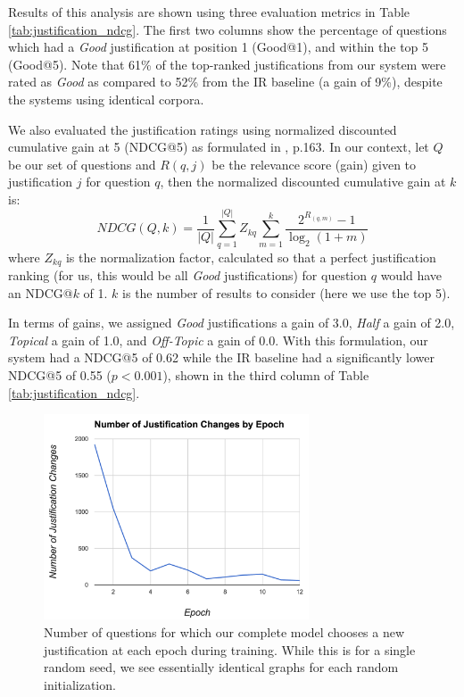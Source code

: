 Results of this analysis are shown using three evaluation metrics in Table \ref{tab:justification_ndcg}.  The first two columns show the percentage of questions which had a \emph{Good} justification at position 1 (Good@1), and within the top 5 (Good@5).  
Note that 61\% of the top-ranked justifications from our system were rated as \emph{Good} as compared to 52\% from the IR baseline (a gain of 9\%), despite the systems using identical corpora.  

We also evaluated the justification ratings using normalized discounted cumulative gain at 5 (NDCG@5) as formulated in \citet{manning08}, p.163.  In our context, let $Q$ be our set of questions and $R(q,j)$ be the relevance score (gain) given to justification $j$ for question $q$, then the normalized discounted cumulative gain at $k$ is:
\begin{equation}
NDCG(Q, k) = \dfrac{1}{|Q|} \sum_{q=1}^{|Q|} Z_{kq} \sum_{m=1}^k \dfrac{2^{R_{(q,m)}} - 1}{\log_2(1+m)}
\end{equation}
where $Z_{kq}$ is the normalization factor, calculated so that a perfect justification ranking (for us, this would be all \textit{Good} justifications) for question $q$ would have an NDCG@$k$ of 1.  $k$ is the number of results to consider (here we use the top 5).  

In terms of gains, we assigned \emph{Good} justifications a gain of 3.0, \emph{Half} a gain of 2.0, \emph{Topical} a gain of 1.0, and \emph{Off-Topic} a gain of 0.0.  With this formulation, our system had a NDCG@5 of 0.62 while the IR baseline had a significantly lower NDCG@5 of 0.55 ($p < 0.001$), shown in the third column of Table \ref{tab:justification_ndcg}. 

\begin{figure}[t]
\begin{center}
\includegraphics[width=0.7\textwidth]{mainmatter/emnlp2017-qaj/justificationChanges.png}
\caption{Number of questions for which %
our complete model chooses a new justification at each epoch during training.  While this is for a single random seed, we see essentially identical graphs for each random initialization.}
\label{fig:changes}
\end{center}
\end{figure}

